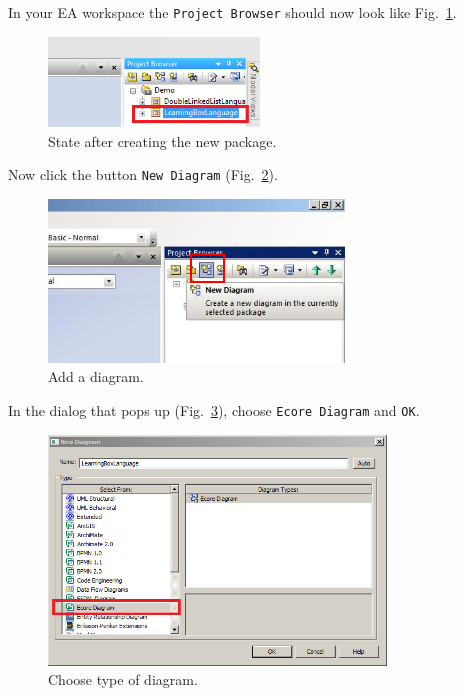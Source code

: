 In your EA workspace the \texttt{Project Browser} should now look like
Fig.~\ref{fig:new_package_completed}.

\begin{figure}[htbp]
	\centering
  \includegraphics[width=0.5\textwidth]{pics/memBoxBilder/memBox03.png}
	\caption{State after creating the new package.}
	\label{fig:new_package_completed}
\end{figure}

\clearpage 

Now click the button \texttt{New Diagram} (Fig.~\ref{fig:diagram}).

\begin{figure}[htbp]
	\centering
  \includegraphics[width=0.7\textwidth]{pics/memBoxBilder/memBox04.png}
	\caption{Add a diagram.}
	\label{fig:diagram}
\end{figure}

In the dialog that pops up (Fig.~\ref{fig:diagram_type}), choose \texttt{Ecore
Diagram} and  \texttt{OK}. 


\begin{figure}[htbp]
	\centering
  \includegraphics[width=0.8\textwidth]{pics/memBoxBilder/memBox05.png}
	\caption{Choose type of diagram.}
	\label{fig:diagram_type}
\end{figure}

